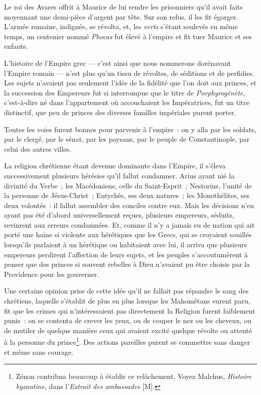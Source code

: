 \documentclass[french,twoside]{book} %
\begin{document}
Le roi des Avares offrit à Maurice de lui rendre les prisonniers qu’il avait faits moyennant une demi-pièce d’argent par tête. Sur son refus, il les fit égorger. L’armée romaine, indignée, se révolta, et, les {\itshape verts} s’étant soulevés en même temps, un centenier nommé {\itshape Phocas} fut élevé à l’empire et fit tuer Maurice et ses enfants.\par
L’histoire de l’Empire grec — c’est ainsi que nous nommerons dorénavant l’Empire romain — n’est plus qu’un tissu de révoltes, de séditions et de perfidies. Les sujets n’avaient pas seulement l’idée de la fidélité que l’on doit aux princes, et la succession des Empereurs fut si interrompue que le titre de {\itshape Porphyrogénète}, c’est-à-dire né dans l’appartement où accouchaient les Impératrices, fut un titre distinctif, que peu de princes des diverses familles impériales purent porter.\par
Toutes les voies furent bonnes pour parvenir à l’empire : on y alla par les soldats, par le clergé, par le sénat, par les paysans, par le peuple de Constantinople, par celui des autres villes.\par
La religion chrétienne étant devenue dominante dans l’Empire, il s’éleva successivement plusieurs hérésies qu’il fallut condamner. Arius ayant nié la divinité du Verbe ; les Macédoniens, celle du Saint-Esprit ; Nestorius, l’unité de la personne de Jésus-Christ ; Eutychès, ses deux natures ; les Monothélites, ses deux volontés : il fallut assembler des conciles contre eux. Mais les décisions n’en ayant pas été d’abord universellement reçues, plusieurs empereurs, séduits, revinrent aux erreurs condamnées. Et, comme il n’y a jamais eu de nation qui ait porté une haine si violente aux hérétiques que les Grecs, qui se croyaient souillés lorsqu’ils parlaient à un hérétique ou habitaient avec lui, il arriva que plusieurs empereurs perdirent l’affection de leurs sujets, et les peuples s’accoutumèrent à penser que des princes si souvent rebelles à Dieu n’avaient pu être choisis par la Providence pour les gouverner.\par
Une certaine opinion prise de cette idée qu’il ne fallait pas répandre le sang des chrétiens, laquelle s’établit de plus en plus lorsque les Mahométans eurent paru, fit que les crimes qui n’intéressaient pas directement la Religion furent faiblement punis : on se contenta de crever les yeux, ou de couper le nez ou les cheveux, ou de mutiler de quelque manière ceux qui avaient excité quelque révolte ou attenté à la personne du prince\footnote{Zénon contribua beaucoup à établir ce relâchement. Voyez Malchus, {\itshape Histoire byzantine}, dans l’{\itshape Extrait des ambassades} [M].}. Des actions pareilles purent se commettre sans danger et même sans courage.\par
\end{document}
